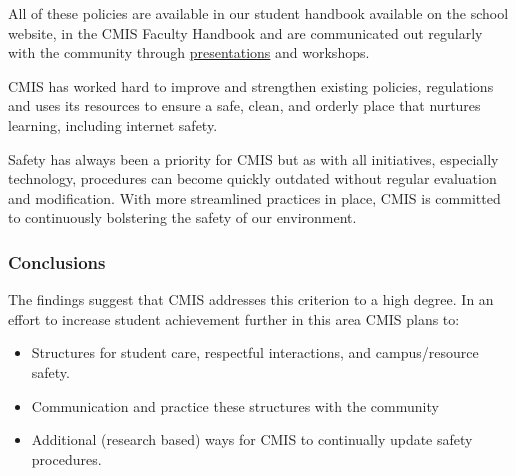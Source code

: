 \begin{findings}
All of these policies are available in our student handbook available on the school website, in the CMIS Faculty Handbook and are communicated out regularly with the community through \href{https://docs.google.com/a/cmis.ac.th/presentation/d/1QRUmBmMM63pQlvP0Qemq272VPojLj5sZv3GuweO9J-Q/edit?usp=sharing}{presentations} and workshops.


CMIS has worked hard to improve and strengthen existing policies, regulations and uses its resources to ensure a safe, clean, and orderly place that nurtures learning, including internet safety. 

Safety has always been a priority for CMIS but as with all initiatives, especially technology, procedures can become quickly outdated without regular evaluation and modification. With more streamlined practices in place, CMIS is committed to continuously bolstering the safety of our environment. 
\end{findings}

\subsubsection{Conclusions}
The findings suggest that CMIS addresses this criterion to a high degree. In an effort to increase student achievement further in this area CMIS plans to:

\begin{itemize}
\item Structures for student care, respectful interactions, and campus/resource safety.
\item Communication and practice these structures with the community
\end{itemize}
\begin{itemize}
\item Additional (research based) ways for CMIS to continually update safety procedures.
\end{itemize}
